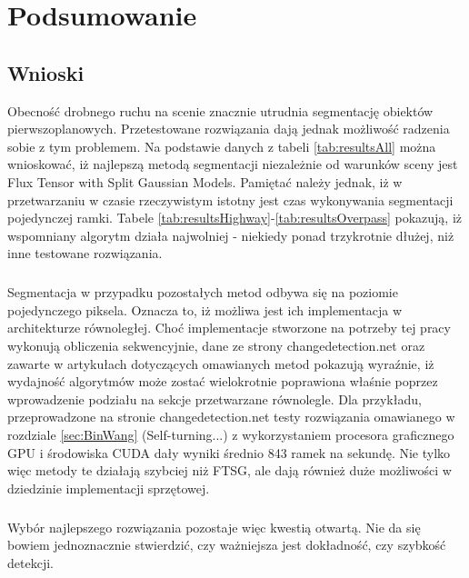 \chapter{Podsumowanie}

\section{Wnioski}
\label{sec:wnioski}
Obecność drobnego ruchu na scenie znacznie utrudnia segmentację obiektów pierwszoplanowych. Przetestowane rozwiązania dają jednak możliwość radzenia sobie z tym problemem. Na podstawie danych z tabeli \ref{tab:resultsAll} można wnioskować, iż najlepszą metodą segmentacji niezależnie od warunków sceny jest Flux Tensor with Split Gaussian Models. Pamiętać należy jednak, iż w\,przetwarzaniu w czasie rzeczywistym istotny jest czas wykonywania segmentacji pojedynczej ramki. Tabele \ref{tab:resultsHighway}-\ref{tab:resultsOverpass} pokazują, iż wspomniany algorytm działa najwolniej - niekiedy ponad trzykrotnie dłużej, niż inne testowane rozwiązania.
\paragraph{}
Segmentacja w przypadku pozostałych metod odbywa się na poziomie pojedynczego piksela. Oznacza to, iż możliwa jest ich implementacja w architekturze równoległej. Choć implementacje stworzone na potrzeby tej pracy wykonują obliczenia sekwencyjnie, dane ze strony changedetection.net oraz zawarte w artykułach dotyczących omawianych metod pokazują wyraźnie, iż wydajność algorytmów może zostać wielokrotnie poprawiona właśnie poprzez wprowadzenie podziału na sekcje przetwarzane równolegle. Dla przykładu, przeprowadzone na stronie changedetection.net testy rozwiązania omawianego w rozdziale \ref{sec:BinWang} (Self-turning...) z wykorzystaniem procesora graficznego GPU i środowiska CUDA dały wyniki średnio 843 ramek na sekundę. Nie tylko więc metody te działają szybciej niż FTSG, ale dają również duże możliwości w\,dziedzinie implementacji sprzętowej.
\paragraph{}
Wybór najlepszego rozwiązania pozostaje więc kwestią otwartą. Nie da się bowiem jednoznacznie stwierdzić, czy ważniejsza jest dokładność, czy szybkość detekcji. 